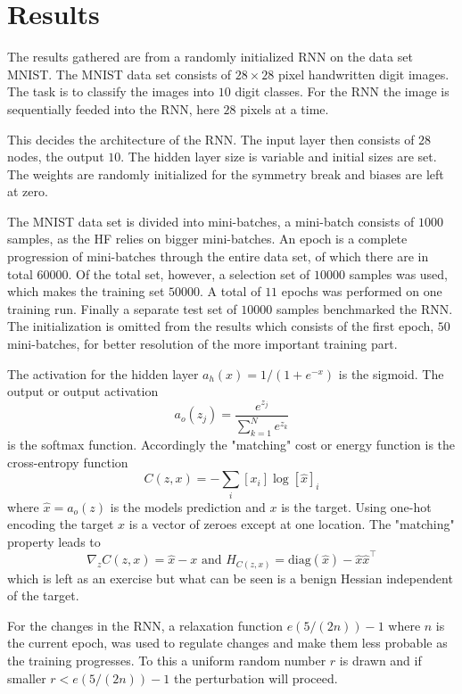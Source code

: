 \chapter{Results}

The results gathered are from a randomly initialized RNN on the data set MNIST. The MNIST data set consists of $28 \times 28$ pixel handwritten digit images. The task is to classify the images into $10$ digit classes. For the RNN the image is sequentially feeded into the RNN, here $28$ pixels at a time. 

This decides the architecture of the RNN. The input layer then consists of $28$ nodes, the output $10$. The hidden layer size is variable and initial sizes are set. The weights are randomly initialized for the symmetry break and biases are left at zero. 

The MNIST data set is divided into mini-batches, a mini-batch consists of $1000$ samples, as the HF relies on bigger mini-batches. An epoch is a complete progression of mini-batches through the entire data set, of which there are in total $60 000$. Of the total set, however, a selection set of $10 000$ samples was used, which makes the training set $50000$. A total of $11$ epochs was performed on one training run. Finally a separate test set of $10000$ samples benchmarked the RNN. The initialization is omitted from the results which consists of the first epoch, $50$ mini-batches, for better resolution of the more important training part.

The activation for the hidden layer $a_h(x) = 1/(1 + e^{-x})$ is the sigmoid. The output or output activation \[a_o(z_j) = \frac{e^{z_j}}{\sum_{k=1}^N e^{z_k}}\] is the softmax function. Accordingly the "matching" cost or energy function is the cross-entropy function \[C(z,x) = - \sum_i [x_i] \log [\hat{x}]_i\] where $\hat{x} = a_o(z)$ is the models prediction and $x$ is the target. Using one-hot encoding the target $x$ is a vector of zeroes except at one location. The "matching" property leads to \[\nabla_z C(z,x) = \hat{x} - x \text{ and } H_{C(z,x)} = \text{diag}(\hat{x}) - \hat{x} \hat{x}^\top\] which is left as an exercise but what can be seen is a benign Hessian independent of the target. 

For the changes in the RNN, a relaxation function $e(5/(2n)) - 1$ where $n$ is the current epoch, was used to regulate changes and make them less probable as the training progresses. To this a uniform random number $r$ is drawn and if smaller $ r < e(5/(2n)) - 1$ the perturbation will proceed.

